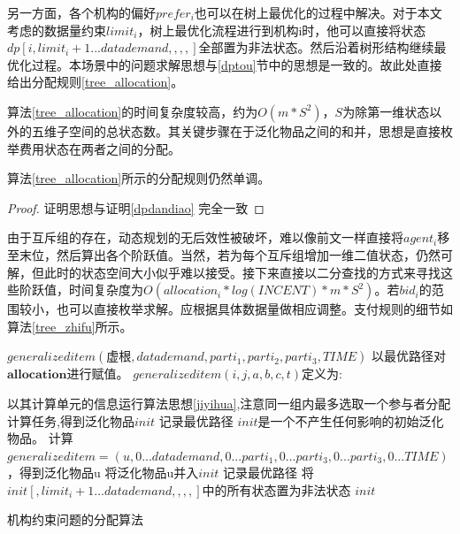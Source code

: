 \documentclass[promaster]{thesis-uestc}
\begin{document}
另一方面，各个机构的偏好$prefer_i$也可以在树上最优化的过程中解决。对于本文考虑的数据量约束$limit_i$，树上最优化流程进行到机构i时，他可以直接将状态$dp[i,limit_i+1...datademand,,,,]$全部置为非法状态。然后沿着树形结构继续最优化过程。本场景中的问题求解思想与\ref{dptou}节中的思想是一致的。故此处直接给出分配规则\ref{tree_allocation}。

算法\ref{tree_allocation}的时间复杂度较高，约为$O(m*S^2)$，$S$为除第一维状态以外的五维子空间的总状态数。其关键步骤在于泛化物品之间的和并，思想是直接枚举费用状态在两者之间的分配。

\begin{theorem}
 算法\ref{tree_allocation}所示的分配规则仍然单调。 
\end{theorem}

\begin{proof}
证明思想与证明\ref{dpdandiao} 完全一致
\end{proof}

由于互斥组的存在，动态规划的无后效性被破坏，难以像前文一样直接将$agent_i$移至末位，然后算出各个阶跃值。当然，若为每个互斥组增加一维二值状态，仍然可解，但此时的状态空间大小似乎难以接受。接下来直接以二分查找的方式来寻找这些阶跃值，时间复杂度为$O(allocation_i*log(INCENT)*m*S^2)$。若$bid_i$的范围较小，也可以直接枚举求解。应根据具体数据量做相应调整。支付规则的细节如算法\ref{tree_zhifu}所示。

\begin{algorithm}[h]
    $generalizeditem(\text{虚根},datademand,parti_1,parti_2,parti_3,TIME)$\;
    以最优路径对$\mathbf{allocation}$进行赋值。\;
    \;
    $generalizeditem(i,j,a,b,c,t)$定义为:\;
    
    {
        以其计算单元的信息运行算法思想\ref{jiyihua},注意同一组内最多选取一个参与者分配计算任务,得到泛化物品$init$\;
        记录最优路径\;
    }{
        $init$是一个不产生任何影响的初始泛化物品。
    }
    {
        计算$generalizeditem=(u,0...datademand,0...parti_1,0...parti_3,0...parti_3,0...TIME)$，得到泛化物品u\;
        将泛化物品u并入$init$\;
        记录最优路径\;
    }
    将$init[,limit_i+1...datademand,,,,]$中的所有状态置为非法状态\;
    \Return $init$\;
\caption{机构约束问题的分配算法}
\label{tree_allocation}
\end{algorithm}
\end{document}
